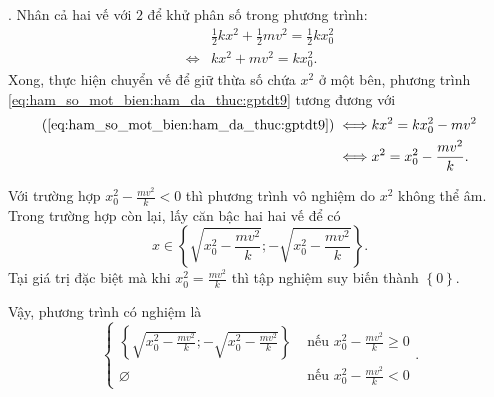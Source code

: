 . Nhân cả hai vế với $2$ để khử phân số trong phương trình:
\begin{align}
   &\frac{1}{2}kx^2 + \frac{1}{2}mv^2 = \frac{1}{2}kx_0^2 \nonumber \\
   \iff &kx^2 + mv^2 = kx_0^2. \label{eq:ham_so_mot_bien:ham_da_thuc:gptdt9}
\end{align}
Xong, thực hiện chuyển vế để giữ thừa số chứa $x^2$ ở một bên, phương trình \ref{eq:ham_so_mot_bien:ham_da_thuc:gptdt9} tương đương với
\begin{align*}
   (\ref{eq:ham_so_mot_bien:ham_da_thuc:gptdt9}) \iff &kx^2 = kx_0^2 - mv^2 \\
   \iff & x^2 = x_0^2 - \frac{mv^2}{k}.
\end{align*}

Với trường hợp $x_0^2 - \frac{mv^2}{k} < 0$ thì phương trình vô nghiệm do $x^2$ không thể âm. Trong trường hợp còn lại, lấy căn bậc hai hai vế để có $$x\in\left\{\sqrt{x_0^2 - \frac{mv^2}{k}}; -\sqrt{x_0^2 - \frac{mv^2}{k}}\right\}.$$ Tại giá trị đặc biệt mà khi $x_0^2 = \frac{mv^2}{k}$ thì tập nghiệm suy biến thành $\left\{0\right\}$.

Vậy, phương trình có nghiệm là 
$$
\begin{cases}
   \left\{\sqrt{x_0^2 - \frac{mv^2}{k}}; -\sqrt{x_0^2 - \frac{mv^2}{k}}\right\} &\text{ nếu } x_0^2 - \frac{mv^2}{k} \geq 0 \\
   \varnothing &\text{ nếu } x_0^2 - \frac{mv^2}{k} < 0
\end{cases}.
$$

